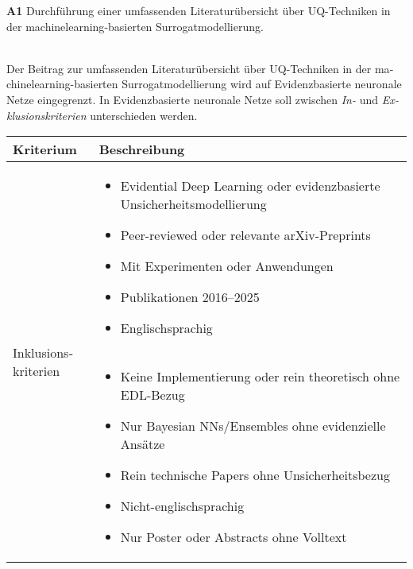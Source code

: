 \begin{otherlanguage}{ngerman}

\pagebreak


\textbf{A1} Durchführung einer umfassenden Literaturübersicht über UQ-Techniken in der \gls{machinelearning}-basierten Surrogatmodellierung.
\par\noindent\\

Der Beitrag zur umfassenden Literaturübersicht über UQ-Techniken in der \gls{machinelearning}-basierten Surrogatmodellierung wird auf \gls{Evidenzbasierte neuronale Netze} eingegrenzt. In \gls{Evidenzbasierte neuronale Netze} soll zwischen \textit{In-} und \textit{Exklusionskriterien} unterschieden werden.

\begin{table}[htbp]
\centering
\footnotesize
\begin{tabularx}{\textwidth}{|l|X|}
\hline
\textbf{Kriterium} & \hspace{0.6em}\textbf{Beschreibung} \\ \hline
\multirow{7}{*}{\centering Inklusionskriterien} &
\begin{itemize}[topsep=0em, itemsep=0em, leftmargin=*, label={}]
  \item Evidential Deep Learning oder evidenzbasierte Unsicherheitsmodellierung
  \item Peer-reviewed oder relevante arXiv-Preprints
  \item Mit Experimenten oder Anwendungen
  \item Publikationen 2016–2025
  \item Englischsprachig
\end{itemize} \\ \hline
\multirow{7}{*}{\centering Exklusionskriterien} &
\begin{itemize}[topsep=0em, itemsep=0em, leftmargin=*, label={}]
  \item Keine Implementierung oder rein theoretisch ohne EDL-Bezug
  \item Nur Bayesian NNs/Ensembles ohne evidenzielle Ansätze
  \item Rein technische Papers ohne Unsicherheitsbezug
  \item Nicht-englischsprachig
  \item Nur Poster oder Abstracts ohne Volltext
\end{itemize} \\ \hline
\end{tabularx}


\end{table}
\end{otherlanguage}
